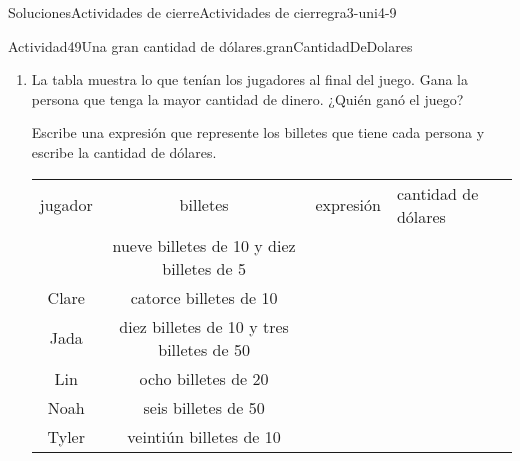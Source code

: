 \documentclass[twoside,10pt,]{article}
\newcommand{\tabularfont}{\relax}
\newcommand{\hrulethick} {\noalign{\hrule height 0.11em}}
\begin{document}
\begin{solutions-section}{Soluciones}{Actividades de cierre}{}{Actividades de cierre}{}{}{gra3-uni4-9}
\begin{activitysolution}{Actividad}{49}{Una gran cantidad de dólares.}{granCantidadDeDolares}
\begin{enumerate}
\begin{enumerate}
\item{}Escribe una expresión para cada forma en la que Noah podría haberle pagado a Lin.%
\end{enumerate}
\item{}La tabla muestra lo que tenían los jugadores al final del juego. Gana la persona que tenga la mayor cantidad de dinero. ¿Quién ganó el juego?%
\par
Escribe una expresión que represente los billetes que tiene cada persona y escribe la cantidad de dólares.%
\begin{center}%
{\tabularfont%
\begin{tabular}{ccll}
\multicolumn{1}{m{0.15\linewidth}}{\centering%
jugador%
}&\multicolumn{1}{m{0.35\linewidth}}{\centering%
billetes%
}&\multicolumn{1}{m{0.25\linewidth}}{\raggedright%
expresión%
}&\multicolumn{1}{m{0.25\linewidth}}{\raggedright%
cantidad de dólares%
}\tabularnewline\hrulethick
\multicolumn{1}{m{0.15\linewidth}}{\centering%
Andre%
}&\multicolumn{1}{m{0.35\linewidth}}{\centering%
nueve billetes de \textdollar{}10 y diez billetes de \textdollar{}5%
}&\multicolumn{1}{m{0.25\linewidth}}{\raggedright%
%
}&\multicolumn{1}{m{0.25\linewidth}}{\raggedright%
%
}\tabularnewline[0pt]
\multicolumn{1}{m{0.15\linewidth}}{\centering%
Clare%
}&\multicolumn{1}{m{0.35\linewidth}}{\centering%
catorce billetes de \textdollar{}10%
}&\multicolumn{1}{m{0.25\linewidth}}{\raggedright%
%
}&\multicolumn{1}{m{0.25\linewidth}}{\raggedright%
%
}\tabularnewline[0pt]
\multicolumn{1}{m{0.15\linewidth}}{\centering%
Jada%
}&\multicolumn{1}{m{0.35\linewidth}}{\centering%
diez billetes de \textdollar{}10 y tres billetes de \textdollar{}50%
}&\multicolumn{1}{m{0.25\linewidth}}{\raggedright%
%
}&\multicolumn{1}{m{0.25\linewidth}}{\raggedright%
%
}\tabularnewline[0pt]
\multicolumn{1}{m{0.15\linewidth}}{\centering%
Lin%
}&\multicolumn{1}{m{0.35\linewidth}}{\centering%
ocho billetes de \textdollar{}20%
}&\multicolumn{1}{m{0.25\linewidth}}{\raggedright%
%
}&\multicolumn{1}{m{0.25\linewidth}}{\raggedright%
%
}\tabularnewline[0pt]
\multicolumn{1}{m{0.15\linewidth}}{\centering%
Noah%
}&\multicolumn{1}{m{0.35\linewidth}}{\centering%
seis billetes de \textdollar{}50%
}&\multicolumn{1}{m{0.25\linewidth}}{\raggedright%
%
}&\multicolumn{1}{m{0.25\linewidth}}{\raggedright%
%
}\tabularnewline[0pt]
\multicolumn{1}{m{0.15\linewidth}}{\centering%
Tyler%
}&\multicolumn{1}{m{0.35\linewidth}}{\centering%
veintiún billetes de \textdollar{}10%
}&\multicolumn{1}{m{0.25\linewidth}}{\raggedright%
%
}&\multicolumn{1}{m{0.25\linewidth}}{\raggedright%
%
}
\end{tabular}
}
\end{center}
\end{enumerate}
\end{activitysolution}
\end{solutions-section}
\end{document}

